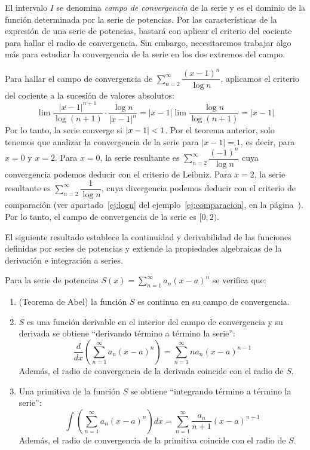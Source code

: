 El intervalo $I$ se denomina \emph{campo de convergencia} de la serie y es el dominio de la función determinada por la serie de potencias.
Por las características de la expresión de una serie de potencias, bastará con aplicar el criterio del cociente para hallar el radio de convergencia.
Sin embargo, necesitaremos trabajar algo más para estudiar la convergencia de la serie en los dos extremos del campo.
%
\begin{ejemplo}
Para hallar el campo de convergencia de $\displaystyle\sum_{n=2}^\infty  \dfrac{(x-1)^n}{\log n}$, aplicamos el criterio del cociente a la sucesión de valores absolutos:
\[
\lim\dfrac{|x-1|^{n+1}}{\log(n+1)}\cdot\dfrac{\log n}{|x-1|^n} = |x-1|\lim\dfrac{\log n}{\log(n+1)}=|x-1|
\]
Por lo tanto, la serie converge si $|x-1|< 1$.
Por el teorema anterior, solo tenemos que analizar la convergencia de la serie para $|x-1|=1$, es decir, para $x=0$ y $x=2$.
Para $x=0$, la serie resultante es $\displaystyle\sum_{n=2}^\infty  \dfrac{(-1)^n}{\log n}$ cuya convergencia podemos deducir con el criterio de Leibniz.
Para $x=2$, la serie resultante es $\displaystyle\sum_{n=2}^\infty  \dfrac{1}{\log n}$, cuya divergencia podemos deducir con el criterio de comparación (ver apartado~\ref{ej:logn}
del ejemplo~\ref{ej:comparacion}, en la página~\pageref{ej:logn}).
Por lo tanto, el campo de convergencia de la serie es $[0,2)$.\fej
\end{ejemplo}

El siguiente resultado establece la continuidad y derivabilidad de las funciones definidas por series de potencias y extiende la propiedades algebraicas de la derivación e integración a series.

\begin{teorema}\label{th:prop-serpot}
Para la serie de potencias $S(x)=\displaystyle\sum_{n=1}^\infty  a_n(x-a)^n$ se verifica que:
\begin{enumerate}
\item\label{th:abel}
(Teorema de Abel) la función $S$ es continua en su campo de convergencia.
\item
$S$ es una función derivable en el interior del campo de convergencia y su derivada se obtiene ``derivando término a término la serie'':
\[
\dfrac{d}{dx}\left(\displaystyle\sum_{n=1}^\infty   a_n(x-a)^n\right)=\displaystyle\sum_{n=1}^\infty   na_n(x-a)^{n-1}
\]
Además, el radio de convergencia de la derivada coincide con el radio de $S$.
\item\label{th:prop-serpot-prim}
Una primitiva de la función $S$ se obtiene 
``integrando término a término la serie'':
\[
\int\left(\displaystyle\sum_{n=1}^\infty   a_n(x-a)^n\right)dx =\displaystyle\sum_{n=1}^\infty   \dfrac{a_n}{n+1}(x-a)^{n+1}
\]
Además, el radio de convergencia de la primitiva coincide con el radio de $S$.
\end{enumerate}
\end{teorema}

